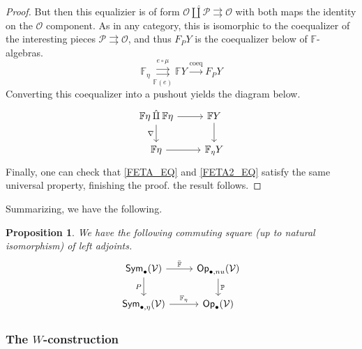 \documentclass[a4paper,10pt
,draft
]{article}%
\numberwithin{equation}{section}
\numberwithin{figure}{section}
\newtheorem{proposition}[equation]{Proposition}%
\theoremstyle{definition} %
\newcommand{\Sym}{\ensuremath{\mathsf{Sym}}}%
\newcommand{\Op}{\mathsf{Op}}%
\newcommand{\V}{\ensuremath{\mathcal V}}
\renewcommand{\O}{\ensuremath{\mathcal O}}
\renewcommand{\P}{\ensuremath{\mathcal P}}
\newcommand{\1}{\ensuremath{\mathbbm 1}}%
\begin{document}
\begin{proof}
      But then this equalizier is of form
      $
      \O \mathbin{\hat{\amalg}} \P \rightrightarrows \O
      $
      with both maps the identity on the $\O$ component.
      As in any category, this is isomorphic to the coequalizer of the interesting pieces
      $\P \rightrightarrows \O$,
      and thus $F_P Y$ is the coequalizer below of $\mathbb F$-algebras.
      \[
            \mathbb F_\eta \overset{e \circ \mu}{\underset{\mathbb F(e)} \rightrightarrows} \mathbb F Y \xrightarrow{\mathrm{coeq}} F_P Y
      \]
      Converting this coequalizer into a pushout yields the diagram below.
      \begin{equation}
            \label{FETA2_EQ}
            \begin{tikzcd}
                  \mathbb F \eta \mathbin{\hat{\amalg}} \mathbb F \eta \arrow[r] \arrow[d, "\nabla"']
                  &
                  \mathbb F Y \arrow[d]
                  \\
                  \mathbb F \eta \arrow[r]
                  &
                  \mathbb F_\eta Y
            \end{tikzcd}
      \end{equation}
      Finally, one can check that \eqref{FETA_EQ} and \eqref{FETA2_EQ} satisfy the same universal property, finishing the proof.
      the result follows.
\end{proof}

Summarizing, we have the following.
\begin{proposition}
      \label{FFACT_PROP}
      We have the following commuting square (up to natural isomorphism) of left adjoints.
      \begin{equation}
            \begin{tikzcd}
                  \Sym_\bullet(\V) \arrow[d, "P"'] \arrow[r, "\bar{\mathbb F}"]
                  &
                  \Op_{\bullet, nu}(\V) \arrow[d, "\mathbb P"]
                  \\
                  \Sym_{\bullet, \eta}(\V) \arrow[r, "\mathbb F_\eta"]
                  &
                  \Op_\bullet(\V)
            \end{tikzcd}
      \end{equation}
\end{proposition}


\subsubsection{The $W$-construction}
\end{document}
